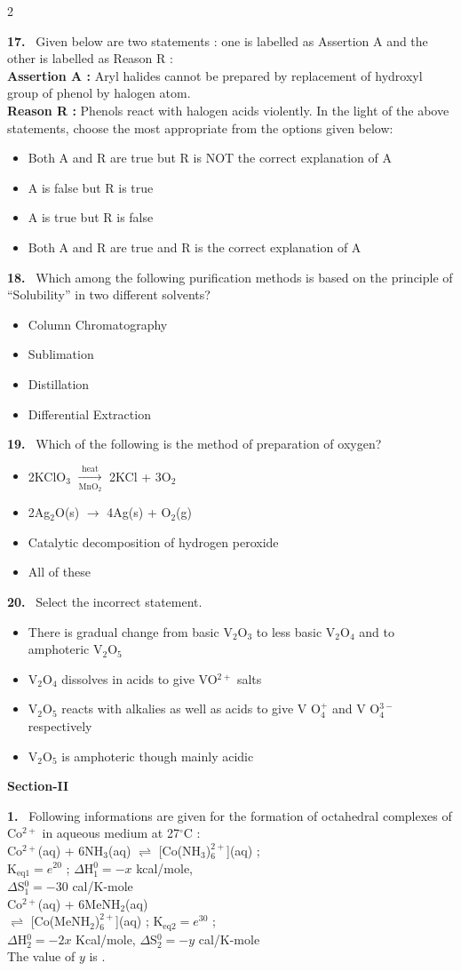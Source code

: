 \documentclass[10pt]{extarticle}
\newcommand{\sect}[1]{\par\smallskip\noindent\textbf{#1}\par}
\newcommand{\qn}[1]{\par\smallskip\noindent\textbf{#1.}~}
\newenvironment{qoptions}{\begin{itemize}[leftmargin=1.8em,itemsep=1pt,topsep=2pt,label={}]}{\end{itemize}}
\newcommand{\opt}[2]{\item[(#1)] #2}
\begin{document}
\begin{multicols}{2}
\qn{17} Given below are two statements : one is labelled as Assertion A and the other is labelled as Reason R :\\
\textbf{Assertion A :} Aryl halides cannot be prepared by replacement of hydroxyl group of phenol by halogen atom.\\
\textbf{Reason R :} Phenols react with halogen acids violently. In the light of the above statements, choose the most appropriate from the options given below:
\begin{qoptions}
\opt{A}{Both A and R are true but R is NOT the correct explanation of A}
\opt{B}{A is false but R is true}
\opt{C}{A is true but R is false}
\opt{D}{Both A and R are true and R is the correct explanation of A}
\end{qoptions}

\qn{18} Which among the following purification methods is based on the principle of ``Solubility'' in two different solvents?
\begin{qoptions}
\opt{A}{Column Chromatography}
\opt{B}{Sublimation}
\opt{C}{Distillation}
\opt{D}{Differential Extraction}
\end{qoptions}

\qn{19} Which of the following is the method of preparation of oxygen?
\begin{qoptions}
\opt{A}{2KClO$_3$ $\xrightarrow[\mathrm{MnO_2}]{\text{heat}}$ 2KCl + 3O$_2$}
\opt{B}{2Ag$_2$O(s) $\to$ 4Ag(s) + O$_2$(g)}
\opt{C}{Catalytic decomposition of hydrogen peroxide}
\opt{D}{All of these}
\end{qoptions}

\qn{20} Select the incorrect statement.
\begin{qoptions}
\opt{A}{There is gradual change from basic V$_2$O$_3$ to less basic V$_2$O$_4$ and to amphoteric V$_2$O$_5$}
\opt{B}{V$_2$O$_4$ dissolves in acids to give VO$^{2+}$ salts}
\opt{C}{V$_2$O$_5$ reacts with alkalies as well as acids to give V O$_4^{+}$ and V O$_4^{3-}$ respectively}
\opt{D}{V$_2$O$_5$ is amphoteric though mainly acidic}
\end{qoptions}

\sect{Section-II}

\qn{1} Following informations are given for the formation of octahedral complexes of Co$^{2+}$ in aqueous medium at 27$^\circ$C :\\
Co$^{2+}$(aq) + 6NH$_3$(aq) $\rightleftharpoons$ [Co(NH$_3$)$_6^{2+}$](aq) ;\\
K$_{\mathrm{eq1}}=e^{20}$ ; $\Delta$H$^0_1=-x$ kcal/mole,\\
$\Delta$S$^0_1=-30$ cal/K-mole\\
Co$^{2+}$(aq) + 6MeNH$_2$(aq)\\
$\rightleftharpoons$ [Co(MeNH$_2$)$_6^{2+}$](aq) ; K$_{\mathrm{eq2}}=e^{30}$ ;\\
$\Delta$H$^0_2=-2x$ Kcal/mole, $\Delta$S$^0_2=-y$ cal/K-mole\\
The value of $y$ is \underline{\hspace{2em}}.


\end{multicols}
\end{document}
